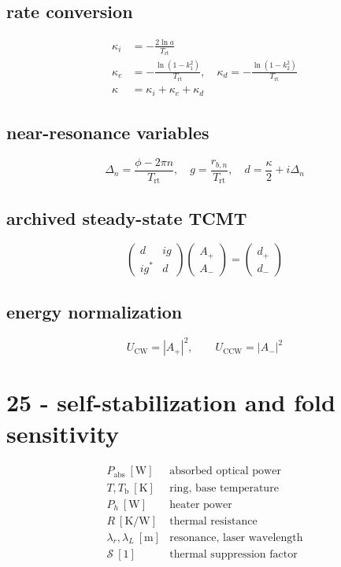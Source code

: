 \subsection*{rate conversion}
\[
\displaystyle \begin{aligned}\kappa_i&=-\frac{2\ln a}{T_{\mathrm{rt}}}\\\kappa_e&=-\frac{\ln(1-k_1^2)}{T_{\mathrm{rt}}},\quad\kappa_d=-\frac{\ln(1-k_2^2)}{T_{\mathrm{rt}}}\\\kappa&=\kappa_i+\kappa_e+\kappa_d\end{aligned}
\]

\subsection*{near-resonance variables}
\[
\displaystyle \Delta_n=\frac{\phi-2\pi n}{T_{\mathrm{rt}}},\quad g=\frac{r_{b,n}}{T_{\mathrm{rt}}},\quad d=\frac\kappa2+i\Delta_n
\]

\subsection*{archived steady-state TCMT}
\[
\displaystyle \begin{pmatrix}d&ig\\ig^*&d\end{pmatrix}\begin{pmatrix}A_+\\A_-\end{pmatrix}=\begin{pmatrix}d_+\\d_-\end{pmatrix}
\]

\subsection*{energy normalization}
\[
\displaystyle U_{\mathrm{CW}}=|A_+|^2,\qquad U_{\mathrm{CCW}}=|A_-|^2
\]

\clearpage
\section*{25 - self-stabilization and fold sensitivity}

\[
\begin{array}{ll}P_{\mathrm{abs}}\ [\mathrm W]&\text{absorbed optical power}\\[0.6em]T,T_{\mathrm b}\ [\mathrm K]&\text{ring, base temperature}\\[0.6em]P_h\ [\mathrm W]&\text{heater power}\\[0.6em]R\ [\mathrm{K/W}]&\text{thermal resistance}\\[0.6em]\lambda_r,\lambda_L\ [\mathrm m]&\text{resonance, laser wavelength}\\[0.6em]\mathcal S\ [1]&\text{thermal suppression factor}\end{array}
\]


